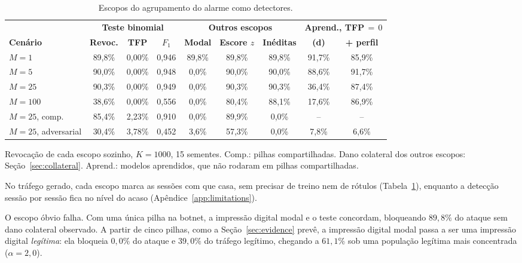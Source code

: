 \documentclass[conference,letterpaper,10pt]{IEEEtran}
\newcommand\1{\textit{(i)}}
\newcommand\2{\textit{(ii)}}
\newcommand\3{\textit{(iii)}}
\begin{document}
\begin{table}[t]
\centering
\caption{Escopos do agrupamento do alarme como detectores.}
\label{tab:symbolic}
\scriptsize
\setlength{\tabcolsep}{1.0pt}
\begin{tabular}{@{}lcccccccc@{}}
\toprule
 & \multicolumn{3}{c}{\textbf{Teste binomial}} & \multicolumn{3}{c}{\textbf{Outros escopos}} & \multicolumn{2}{c}{\textbf{Aprend., TFP$\,{=}\,0$}} \\
\cmidrule(lr){2-4}\cmidrule(lr){5-7}\cmidrule(l){8-9}
\textbf{Cenário} & \textbf{Revoc.} & \textbf{TFP} & \textbf{$F_1$} & \textbf{Modal} & \textbf{Escore $z$} & \textbf{Inéditas} & \textbf{(d)} & \textbf{+ perfil} \\
\midrule
$M{=}1$                 & 89,8\% & 0,00\% & 0,946 & 89,8\% & 89,8\% & 89,8\% & 91,7\% & 85,9\% \\
$M{=}5$                 & 90,0\% & 0,00\% & 0,948 & 0,0\%  & 90,0\% & 90,0\% & 88,6\% & 91,7\% \\
$M{=}25$                & 90,3\% & 0,00\% & 0,949 & 0,0\% & 90,3\% & 90,3\% & 36,4\% & 87,4\% \\
$M{=}100$               & 38,6\% & 0,00\% & 0,556 & 0,0\%  & 80,4\% & 88,1\% & 17,6\% & 86,9\% \\
$M{=}25$, comp.        & 85,4\% & 2,23\% & 0,910 & 0,0\%  & 89,9\% & 0,0\%  & --     & --     \\
$M{=}25$, adversarial   & 30,4\% & 3,78\% & 0,452 & 3,6\%  & 57,3\% & 0,0\%  & 7,8\%  & 6,6\%  \\
\bottomrule
\end{tabular}

\vspace{2pt}
{\footnotesize Revocação de cada escopo sozinho, $K = 1000$, 15 sementes. Comp.: pilhas compartilhadas. Dano colateral dos outros escopos: Seção~\ref{sec:collateral}. Aprend.: modelos aprendidos, que não rodaram em pilhas compartilhadas.}
\end{table}

No tráfego gerado, cada escopo marca as sessões com que casa, sem precisar de treino nem de rótulos (Tabela~\ref{tab:symbolic}), enquanto a detecção sessão por sessão fica no nível do acaso (Apêndice~\ref{app:limitations}).

O escopo óbvio falha. Com uma única pilha na botnet, a impressão digital modal e o teste concordam, bloqueando $89{,}8\%$ do ataque sem dano colateral observado. A partir de cinco pilhas, como a Seção~\ref{sec:evidence} prevê, a impressão digital modal passa a ser uma impressão digital \textit{legítima}: ela bloqueia $0{,}0\%$ do ataque e $39{,}0\%$ do tráfego legítimo, chegando a $61{,}1\%$ sob uma população legítima mais concentrada ($\alpha = 2{,}0$).
\end{document}

